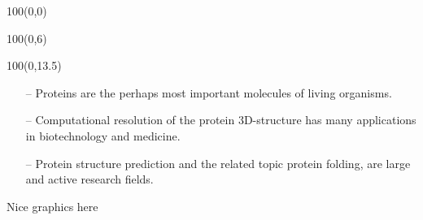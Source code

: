 \documentclass[a0,portrait]{a0poster}
\begin{document}
\fontsize{40pt}{60pt}\selectfont

\begin{textblock}{100}(0,0)
\\[1cm]
\end{textblock}

\begin{textblock}{100}(0,6)
\end{textblock}

\begin{textblock}{100}(0,13.5)
\\[-8mm]
\end{textblock}

\linespread{1.075}\fontsize{28pt}{40pt}\selectfont

\begin{GridBlock}{0}{21}{48}
    \begin{itemize}
    \item[-- ] Proteins are the perhaps most important molecules of
      living organisms.
    \item[-- ] Computational resolution of the protein 3D-structure has
      many applications in biotechnology and medicine.
    \item[-- ] Protein structure prediction and the related topic protein
      folding, are large and active research fields.
    \end{itemize}
\end{GridBlock}

\begin{GridBlock}{51}{21}{48}
Nice graphics here
\end{GridBlock}
\end{document}
